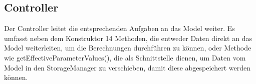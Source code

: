 \subsection{Controller} \label{subsec:controller}

Der Controller leitet die entsprechenden Aufgaben an das Model weiter. Es umfasst neben dem Konstruktor 14 Methoden, die entweder Daten direkt an das Model weiterleiten, um die Berechnungen durchführen zu können, oder Methode wie getEffectiveParameterValues(), die als Schnittstelle dienen, um Daten vom Model in den StorageManager zu verschieben, damit diese abgespeichert werden können.



